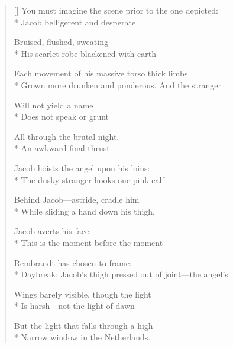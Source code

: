 \label{ch:rembrandt_wrestling}
\settowidth{\versewidth}{Daybreak:   Jacob's thigh pressed out of joint---the angel's}
\begin{verse}[\versewidth]
You must imagine the scene prior to the one depicted:\\*
Jacob belligerent and desperate

Bruised, flushed, sweating\\*
His scarlet robe blackened with earth

Each movement of his massive torso      thick limbs\\*
Grown more drunken and ponderous.     And the stranger

Will not yield a name\\*
Does not speak or grunt

All through the brutal night.\\*
An awkward final thrust---

Jacob hoists the angel upon his loins:\\*
The dusky stranger hooks one pink calf

Behind Jacob---astride, cradle him\\*
While sliding a hand down his thigh.

Jacob averts his face:\\*
This is the moment before the moment

Rembrandt has chosen to frame:\\*
Daybreak:   Jacob's thigh pressed out of joint---the angel's

Wings barely visible, though the light\\*
Is harsh---not the light of dawn

But the light that falls through a high\\*
Narrow window in the Netherlands.
\end{verse}
